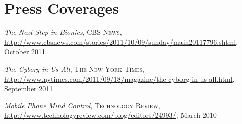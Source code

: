\section{\sc Press Coverages}
\emph{The Next Step in Bionics}, \textsc{CBS News},
\url{http://www.cbsnews.com/stories/2011/10/09/sunday/main20117796.shtml},
October 2011
\vspace*{-2.5mm}

\emph{The Cyborg in Us All}, \textsc{The New York Times},
\url{http://www.nytimes.com/2011/09/18/magazine/the-cyborg-in-us-all.html},
September 2011
\vspace*{-2.5mm}

\emph{Mobile Phone Mind Control}, \textsc{Technology Review},
\url{http://www.technologyreview.com/blog/editors/24993/}, March 2010
\vspace*{-2.5mm}
